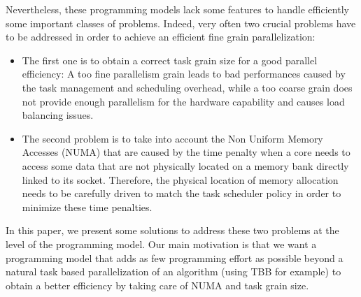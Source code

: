 Nevertheless, these programming models lack some features to handle efficiently
some important classes of problems.
Indeed, very often two crucial problems have to be addressed in order to achieve
an efficient fine grain parallelization:
\begin{itemize}
\item The first one is to obtain a correct task grain size for a good parallel
  efficiency: A too fine parallelism grain leads to bad performances caused by
  the task management and scheduling overhead, while a too coarse grain does not
  provide enough parallelism for the hardware capability and causes load balancing issues.
\item The second problem is to take into account the Non Uniform Memory Accesses (NUMA)
  that are caused by the time penalty when a core needs to access some data that
  are not physically located on a memory bank directly linked to its socket.
  Therefore, the physical location of memory allocation needs to be carefully driven
  to match the task scheduler policy in order to minimize these time penalties.
\end{itemize}

In this paper, we present some solutions to address these two problems at the
level of the programming model.
Our main motivation is that we want a programming model that adds as few
programming effort as possible beyond a natural task based parallelization of
an algorithm (using TBB for example) to obtain a better efficiency by taking
care of NUMA and task grain size.


